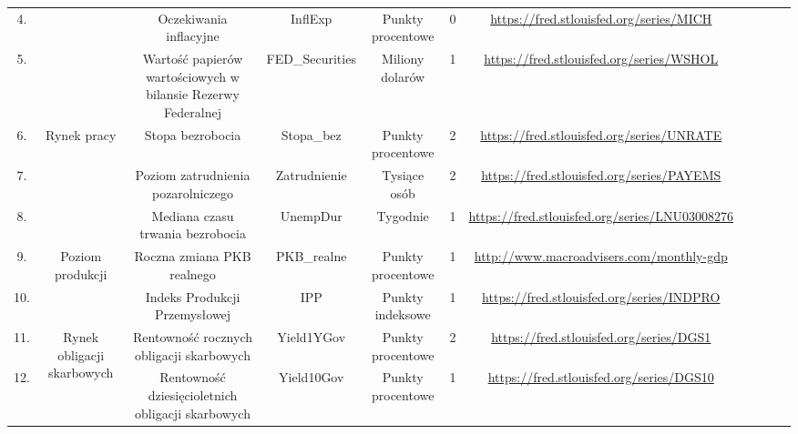 \begin{landscape}
\begin{table}[h]
\begin{tabular}{|c|c|c|c|c|c|c|llll}
4.   &                                    & Oczekiwania inflacyjne & InflExp                          & Punkty procentowe    & 0 & \url{https://fred.stlouisfed.org/series/MICH}             &  &  &  & \\ \cline{1-1} \cline{3-7} 
5.           &  &  Wartość papierów wartościowych w bilansie Rezerwy Federalnej                                 & FED\_Securities                  & Miliony dolarów      & 1 & \url{https://fred.stlouisfed.org/series/WSHOL}            &  &  &  &  \\ \cline{1-7}
6.            & \multirow{3}{*}{Rynek pracy}                     & Stopa bezrobocia & Stopa\_bez                       & Punkty procentowe  & 2  & \url{https://fred.stlouisfed.org/series/UNRATE}          &  &  &  &  \\ \cline{1-1} \cline{3-7}
7.            &                                                  & Poziom zatrudnienia pozarolniczego & Zatrudnienie                     & Tysiące osób     & 2  & \url{https://fred.stlouisfed.org/series/PAYEMS}            &  &  &  &  \\ \cline{1-1} \cline{3-7}
8.            &                                                  & Mediana czasu trwania bezrobocia                                                            & UnempDur                         & Tygodnie             & 1 & \url{https://fred.stlouisfed.org/series/LNU03008276}      &  &  &  &  \\ \cline{1-7}
9.            & \multirow{2}{*}{Poziom produkcji}                & Roczna zmiana PKB realnego & PKB\_realne                      & Punkty procentowe & 1 & \url{http://www.macroadvisers.com/monthly-gdp}            &  &  &  &  \\ \cline{1-1} \cline{3-7}
10.            &                                                  & Indeks Produkcji Przemysłowej & IPP                              & Punkty indeksowe &  1  & \url{https://fred.stlouisfed.org/series/INDPRO}           &  &  &  &  \\ \cline{1-7}
11.           & \multirow{3}{*}{Rynek obligacji skarbowych}      & Rentowność rocznych obligacji skarbowych & Yield1YGov                       & Punkty procentowe  & 2  & \url{https://fred.stlouisfed.org/series/DGS1}              &  &  &  &  \\ \cline{1-1} \cline{3-7}
12.           &                                                  & Rentowność dziesięcioletnich obligacji skarbowych & Yield10Gov                       & Punkty procentowe  & 1  & \url{https://fred.stlouisfed.org/series/DGS10}             &  &  &  &  \\ \cline{1-1} \cline{3-7}

\end{tabular}
\end{table}
\end{landscape}
